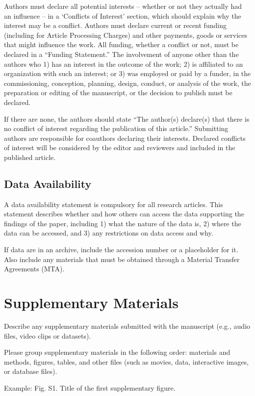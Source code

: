 \documentclass{article}
\begin{document}
Authors must declare all potential interests – whether or not they actually had an influence – in a ‘Conflicts of Interest’ section, which should explain why the interest may be a conflict. Authors must declare current or recent funding (including for Article Processing Charges) and other payments, goods or services that might influence the work. All funding, whether a conflict or not, must be declared in a ``Funding Statement.'' The involvement of anyone other than the authors who 1) has an interest in the outcome of the work; 2) is affiliated to an organization with such an interest; or 3) was employed or paid by a funder, in the commissioning, conception, planning, design, conduct, or analysis of the work, the preparation or editing of the manuscript, or the decision to publish must be declared.

If there are none, the authors should state ``The author(s) declare(s) that there is no conflict of interest regarding the publication of this article.'' Submitting authors are responsible for coauthors declaring their interests. Declared conflicts of interest will be considered by the editor and reviewers and included in the published article.

\subsection*{Data Availability}
A data availability statement is compulsory for all research articles. This statement describes whether and how others can access the data supporting the findings of the paper, including 1) what the nature of the data is, 2) where the data can be accessed, and 3) any restrictions on data access and why.

If data are in an archive, include the accession number or a placeholder for it. Also include any materials that must be obtained through a Material Transfer Agreements (MTA). 

\section*{Supplementary Materials}
Describe any supplementary materials submitted with the manuscript (e.g., audio files, video clips or datasets). 

Please group supplementary materials in the following order: materials and methods, figures, tables, and other files (such as movies, data, interactive images, or database files). 

\medskip Example:
Fig. S1. Title of the first supplementary figure.
\end{document}
